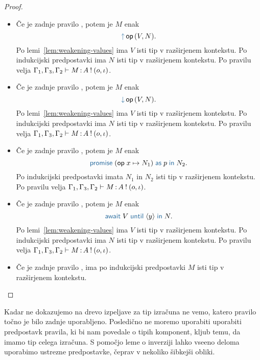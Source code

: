 \begin{proof}
\begin{itemize}
		\item Če je zadnje pravilo , potem je $M$ enak $$\tmopout{op}{V}{N}.$$
		Po lemi~\ref{lem:weakening-values} ima $V$ isti tip v razširjenem kontekstu.
		Po indukcijski predpostavki ima $N$ isti tip v razširjenem kontekstu.
		Po pravilu  velja $\Gamma_1, \Gamma_3, \Gamma_2 \vdash M \mathinner{:} A \mathbin{!} (o, \iota)$.
		
		\item Če je zadnje pravilo , potem je $M$ enak $$\tmopin{op}{V}{N}.$$
		Po lemi~\ref{lem:weakening-values} ima $V$ isti tip v razširjenem kontekstu.
		Po indukcijski predpostavki ima $N$ isti tip v razširjenem kontekstu.
		Po pravilu  velja $\Gamma_1, \Gamma_3, \Gamma_2 \vdash M \mathinner{:} A \mathbin{!} (o, \iota)$.
		
		\item Če je zadnje pravilo , potem je $M$ enak $$\tmwith{op}{x}{N_1}{p}{N_2}.$$
		Po indukcijski predpostavki imata $N_1$ in $N_2$ isti tip v razširjenem kontekstu.
		Po pravilu  velja $\Gamma_1, \Gamma_3, \Gamma_2 \vdash M \mathinner{:} A \mathbin{!} (o, \iota)$.
		
		\item Če je zadnje pravilo , potem je $M$ enak $$\tmawait{V}{y}{N}.$$
		Po lemi~\ref{lem:weakening-values} ima $V$ isti tip v razširjenem kontekstu.
		Po indukcijski predpostavki ima $N$ isti tip v razširjenem kontekstu.
		Po pravilu  velja $\Gamma_1, \Gamma_3, \Gamma_2 \vdash M \mathinner{:} A \mathbin{!} (o, \iota)$.
		
		\item Če je zadnje pravilo , ima po indukcijski predpostavki $M$ isti tip v razširjenem kontekstu.
		
	\end{itemize}
\end{proof}

Kadar ne dokazujemo na drevo izpeljave za tip izračuna ne vemo, katero pravilo točno je bilo zadnje uporabljeno. Posledično ne moremo uporabiti uporabiti predpostavk pravila, ki bi nam povedale o tipih komponent, kljub temu, da imamo tip celega izračuna.
S pomočjo leme o inverziji lahko vseeno deloma uporabimo ustrezne predpostavke, čeprav v nekoliko šibkejši obliki.

